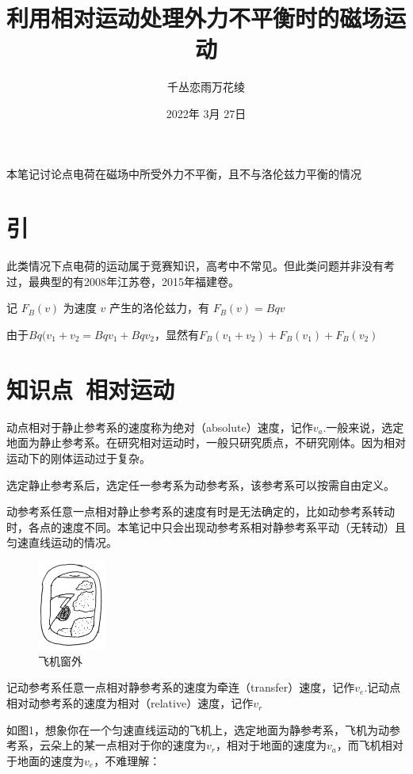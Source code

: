\documentclass[UTF8]{article}
\title{利用相对运动处理外力不平衡时的磁场运动}
\author{千丛恋雨万花绫}
\date{2022年 3月 27日}
\begin{document}
\maketitle


本笔记讨论点电荷在磁场中所受外力不平衡，且不与洛伦兹力平衡的情况

\section*{引}

此类情况下点电荷的运动属于竞赛知识，高考中不常见。但此类问题并非没有考过，最典型的有2008年江苏卷，2015年福建卷。

记 $F_{B}(v)$ 为速度 $v$ 产生的洛伦兹力，有 $F_{B}(v)=Bqv$

由于$Bq(v_{1}+v_{2}=Bqv_{1}+Bqv_{2}$，显然有$F_{B}(v_{1}+v_{2})+F_{B}(v_{1})+F_{B}(v_{2})$

\section*{知识点\ 相对运动}

动点相对于静止参考系的速度称为绝对（absolute）速度，记作$v_{a}$.一般来说，选定地面为静止参考系。在研究相对运动时，一般只研究质点，不研究刚体。因为相对运动下的刚体运动过于复杂。

选定静止参考系后，选定任一参考系为动参考系，该参考系可以按需自由定义。

动参考系任意一点相对静止参考系的速度有时是无法确定的，比如动参考系转动时，各点的速度不同。本笔记中只会出现动参考系相对静参考系平动（无转动）且匀速直线运动的情况。

\begin{figure}
    \centering
    \includegraphics[width=0.2\textwidth]{onPlane}
    \caption{飞机窗外}
\end{figure}

记动参考系任意一点相对静参考系的速度为牵连（transfer）速度，记作$v_{e}$.记动点相对动参考系的速度为相对（relative）速度，记作$v_{r}$

如图1，想象你在一个匀速直线运动的飞机上，选定地面为静参考系，飞机为动参考系，云朵上的某一点相对于你的速度为$v_{r}$，相对于地面的速度为$v_{a}$，而飞机相对于地面的速度为$v_{e}$，不难理解：
\end{document}
